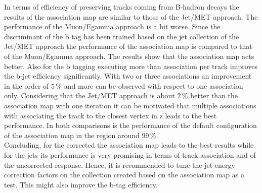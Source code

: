 In terms of efficiency of preserving tracks coming from B-hadron decays the results of the association map are similar to those of the Jet/MET approach. The performance of the Muon/Egamma approach is a bit worse. Since the discriminant of the b tag has been trained based on the jet collection of the Jet/MET approach the performance of the association map is compared to that of the Muon/Egamma approach. The results show that the association map acts better. Also for the b tagging executing more than association per track improves the b-jet efficiency significantly. With two or three associations an improvement in the order of $5\,\%$ and more can be observed with respect to one association only. Considering that the Jet/MET approach is about $2\,\%$ better than the association map with one iteration it can be motivated that multiple associations with associating the track to the closest vertex in z leads to the best performance. In both comparisons is the performance of the default configuration of the association map in the region around $99\,\%$. \\
Concluding, for the corrected \MET{} the association map leads to the best results while for the jets its performance is very promising in terms of track association and of the uncorrected \pt{} response. Hence, it is recommended to tune the jet energy correction factors on the collection created based on the association map as a test. This might also improve the b-tag efficiency.
